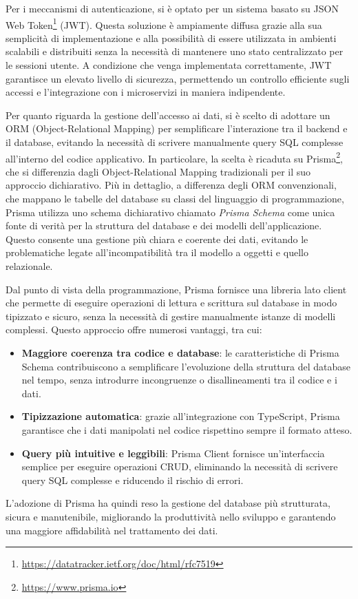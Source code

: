Per i meccanismi di autenticazione, si è optato per un sistema basato su JSON Web Token\footnote{\url{https://datatracker.ietf.org/doc/html/rfc7519}} (JWT). Questa soluzione è ampiamente diffusa grazie alla sua semplicità di implementazione e alla possibilità di essere utilizzata in ambienti scalabili e distribuiti senza la necessità di mantenere uno stato centralizzato per le sessioni utente. A condizione che venga implementata correttamente, JWT garantisce un elevato livello di sicurezza, permettendo un controllo efficiente sugli accessi e l'integrazione con i microservizi in maniera indipendente.

Per quanto riguarda la gestione dell’accesso ai dati, si è scelto di adottare un ORM (Object-Relational Mapping) per semplificare l’interazione tra il backend e il database, evitando la necessità di scrivere manualmente query SQL complesse all’interno del codice applicativo. In particolare, la scelta è ricaduta su Prisma\footnote{\url{https://www.prisma.io}}, che si differenzia dagli Object-Relational Mapping tradizionali per il suo approccio dichiarativo. Più in dettaglio, a differenza degli ORM convenzionali, che mappano le tabelle del database su classi del linguaggio di programmazione, Prisma utilizza uno schema dichiarativo chiamato \textit{Prisma Schema} come unica fonte di verità per la struttura del database e dei modelli dell’applicazione. Questo consente una gestione più chiara e coerente dei dati, evitando le problematiche legate all'incompatibilità tra il modello a oggetti e quello relazionale.

Dal punto di vista della programmazione, Prisma fornisce una libreria lato client che permette di eseguire operazioni di lettura e scrittura sul database in modo tipizzato e sicuro, senza la necessità di gestire manualmente istanze di modelli complessi. Questo approccio offre numerosi vantaggi, tra cui:
\begin{itemize}
  \item \textbf{Maggiore coerenza tra codice e database}: le caratteristiche di Prisma Schema contribuiscono a semplificare l'evoluzione della struttura del database nel tempo, senza introdurre incongruenze o disallineamenti tra il codice e i dati.
  \item \textbf{Tipizzazione automatica}: grazie all’integrazione con TypeScript, Prisma garantisce che i dati manipolati nel codice rispettino sempre il formato atteso.
  \item \textbf{Query più intuitive e leggibili}: Prisma Client fornisce un'interfaccia semplice per eseguire operazioni CRUD, eliminando la necessità di scrivere query SQL complesse e riducendo il rischio di errori.
\end{itemize}
L'adozione di Prisma ha quindi reso la gestione del database più strutturata, sicura e manutenibile, migliorando la produttività nello sviluppo e garantendo una maggiore affidabilità nel trattamento dei dati.

